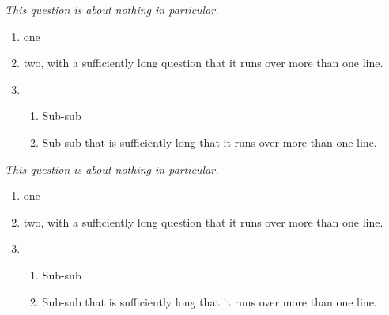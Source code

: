 \documentclass{ouexam}
\begin{document}
\question
\emph{This question is about nothing in particular.}
\begin{enumerate}
\item one
\item two, with a sufficiently long question that it runs over more than one line.
\item 
\begin{enumerate}
\item Sub-sub
\item Sub-sub that is sufficiently long that it runs over more than one line.
\end{enumerate}
\end{enumerate}

\question
\emph{This question is about nothing in particular.}
\begin{enumerate}
\item one
\item two, with a sufficiently long question that it runs over more than one line.
\item 
\begin{enumerate}
\item Sub-sub
\item Sub-sub that is sufficiently long that it runs over more than one line.
\end{enumerate}
\end{enumerate}


\end{document}
